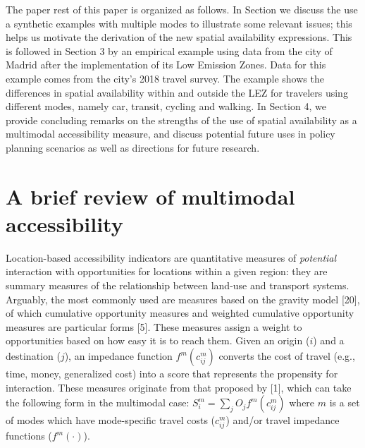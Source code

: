 \documentclass[10pt,letterpaper]{article}
\begin{document}
The paper rest of this paper is organized as follows. In Section we
discuss the use a synthetic examples with multiple modes to illustrate
some relevant issues; this helps us motivate the derivation of the new
spatial availability expressions. This is followed in Section 3 by an
empirical example using data from the city of Madrid after the
implementation of its Low Emission Zones. Data for this example comes
from the city's 2018 travel survey. The example shows the differences in
spatial availability within and outside the LEZ for travelers using
different modes, namely car, transit, cycling and walking. In Section 4,
we provide concluding remarks on the strengths of the use of spatial
availability as a multimodal accessibility measure, and discuss
potential future uses in policy planning scenarios as well as directions
for future research.

\hypertarget{a-brief-review-of-multimodal-accessibility}{%
\section{A brief review of multimodal
accessibility}\label{a-brief-review-of-multimodal-accessibility}}

Location-based accessibility indicators are quantitative measures of
\emph{potential} interaction with opportunities for locations within a
given region: they are summary measures of the relationship between
land-use and transport systems. Arguably, the most commonly used are
measures based on the gravity model {[}20{]}, of which cumulative
opportunity measures and weighted cumulative opportunity measures are
particular forms {[}5{]}. These measures assign a weight to
opportunities based on how easy it is to reach them. Given an origin
(\(i\)) and a destination (\(j\)), an impedance function
\(f^{m}(c^m_{ij})\) converts the cost of travel (e.g., time, money,
generalized cost) into a score that represents the propensity for
interaction. These measures originate from that proposed by {[}1{]},
which can take the following form in the multimodal case:
\(S_i^m = \sum_j O_j f^m(c_{ij}^m)\) where \(m\) is a set of modes which
have mode-specific travel costs (\(c_{ij}^m\)) and/or travel impedance
functions (\(f^m(\cdot)\)).
\end{document}
